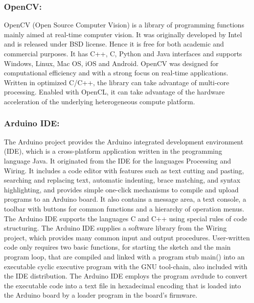 \documentclass[14pt]{extarticle}
\begin{document}
\subsubsection{OpenCV:}
{\quad}OpenCV (Open Source Computer Vision) is a library of programming functions mainly aimed at real-time computer vision. It was originally developed by Intel and is released under BSD license. Hence it is free for both academic and commercial purposes.  It has C++, C, Python and Java interfaces and supports Windows, Linux, Mac OS, iOS and Android. OpenCV was designed for computational efficiency and with a strong focus on real-time applications. Written in optimized C/C++, the library can take advantage of multi-core processing. Enabled with OpenCL, it can take advantage of the hardware acceleration of the underlying heterogeneous compute platform.

\subsubsection{Arduino IDE:}
{\quad}The Arduino project provides the Arduino integrated development environment (IDE), which is a cross-platform application written in the programming language Java. It originated from the IDE for the languages Processing and Wiring. It includes a code editor with features such as text cutting and pasting, searching and replacing text, automatic indenting, brace matching, and syntax highlighting, and provides simple one-click mechanisms to compile and upload programs to an Arduino board. It also contains a message area, a text console, a toolbar with buttons for common functions and a hierarchy of operation menus.\\

{\quad}The Arduino IDE supports the languages C and C++ using special rules of code structuring. The Arduino IDE supplies a software library from the Wiring project, which provides many common input and output procedures. User-written code only requires two basic functions, for starting the sketch and the main program loop, that are compiled and linked with a program stub main() into an executable cyclic executive program with the GNU tool-chain, also included with the IDE distribution. The Arduino IDE employs the program avrdude to convert the executable code into a text file in hexadecimal encoding that is loaded into the Arduino board by a loader program in the board's firmware.
\end{document}
